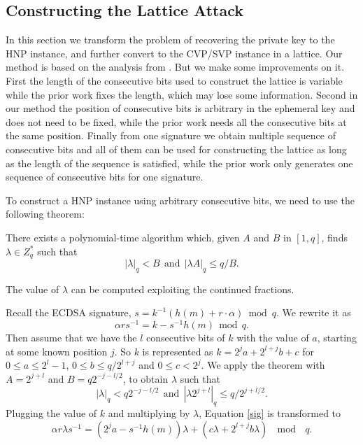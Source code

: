 \subsection{Constructing the Lattice Attack}
\label{data_proc2}
In this section we transform the problem of recovering the private key to the HNP instance, and further convert to the CVP/SVP instance in a lattice.
Our method is based on the analysis from \cite{Nguyen2002}.
But we make some improvements on it.
First the length of the consecutive bits used to construct the lattice is variable while the prior work fixes the length, which may lose some information.
Second  in our method the position of consecutive bits is arbitrary in the ephemeral key and does not need to be fixed, while the prior work needs all the consecutive bits at the same position.
Finally from one signature we obtain multiple sequence of consecutive bits and all of them can be used for constructing the lattice as long as the length of the sequence is satisfied, while the prior work only generates one sequence of consecutive bits for one signature.

To construct a HNP instance using arbitrary consecutive bits, we need to use the following theorem\cite{Nguyen2002}:
\begin{theorem}
 \label{theorem1}
There exists a polynomial-time algorithm which, given $A$ and $B$ in $[1, q]$, finds $\lambda \in Z^{*}_{q}$ such that
$$
|\lambda |_q < B  \ \  \text{and} \ \  |\lambda A|_q \leq q/B .
$$
\end{theorem}
The value of $\lambda$ can be computed exploiting the continued fractions.

Recall the ECDSA signature, $s = k^{-1} (h(m) + r\cdot\alpha) \bmod q$.
We rewrite it as
\begin{equation}
\label{sig}
\alpha rs^{-1} = k - s^{-1}h(m)  \ \  \text{mod} \ \ q.
\end{equation}
Then assume that we have the $l$ consecutive bits of $k$ with the value of $a$, starting at some known position $j$.
 So $k$ is represented as $k = 2^{j}a + 2^{l+j}b +c$ for $0 \leq a \leq 2^l -1$, $0\leq b \leq q/2^{l+j}$ and $0 \leq c < 2^j$.
 We apply the theorem with $A = 2^{j+l}$ and $B = q2^{-j-l/2}$, to obtain $\lambda$ such that
$$
|\lambda |_q < q2^{-j-l/2}  \ \  \text{and} \ \  |\lambda 2^{j+l}|_q \leq q/2^{j+l/2} .
$$
Plugging the value of $k$ and multiplying by $\lambda$, Equation \ref{sig} is transformed to
$$
\alpha r\lambda s^{-1} = (2^{j}a - s^{-1}h(m))\lambda +(c\lambda + 2^{l+j}b\lambda)  \ \  \bmod \ \ q.
$$

